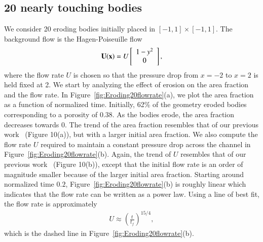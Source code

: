 \documentclass[preprint, 10pt]{elsarticle}
\begin{document}
\subsection{20 nearly touching bodies}
We consider 20 eroding bodies initially placed in $[-1,1] \times
[-1,1]$.  The background flow is the Hagen-Poiseuille flow
\begin{align}
  {\mathbf{U}}({\mathbf{x}})=U \left[
  \begin{array}{c}
    1-y^2 \\ 0
  \end{array}
  \right],
\end{align}
where the flow rate $U$ is chosen so that the pressure drop from $x=-2$
to $x=2$ is held fixed at 2.  We start by analyzing the effect of
erosion on the area fraction and the flow rate.  In
Figure~\ref{fig:Eroding20flowrate}(a), we plot the area fraction as a
function of normalized time.  Initially, 62\%  of the geometry eroded
bodies corresponding to a porosity of $0.38$.  As the bodies erode, the
area fraction decreases towards 0.  The trend of the area fraction
resembles that of our previous work~\cite{qua-moo2018} (Figure 10(a)),
but with a larger initial area fraction.  We also compute the flow rate
$U$ required to maintain a constant pressure drop across the channel in
Figure~\ref{fig:Eroding20flowrate}(b).  Again, the trend of $U$
resembles that of our previous work~\cite{qua-moo2018} (Figure 10(b)),
except that the initial flow rate is an order of magnitude smaller
because of the larger initial area fraction.  Starting around normalized
time $0.2$, Figure~\ref{fig:Eroding20flowrate}(b) is roughly linear
which indicates that the flow rate can be written as a power law.  Using
a line of best fit, the flow rate is approximately \begin{align} U
\approx \left(\frac{t}{t_f}\right)^{15/4}, \end{align}
 which is the dashed
line in Figure~\ref{fig:Eroding20flowrate}(b).
\end{document}
